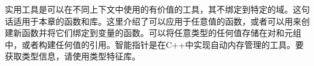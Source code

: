 


实用工具是可以在不同上下文中使用的有价值的工具，其不绑定到特定的域。这句话适用于本章的函数和库。这里介绍了可以应用于任意值的函数，或者可以用来创建新函数并将它们绑定到变量的函数。可以将任意类型的任何值存储在对和元组中，或者构建任何值的引用。智能指针是在C++中实现自动内存管理的工具。要获取类型信息，请使用类型特征库。